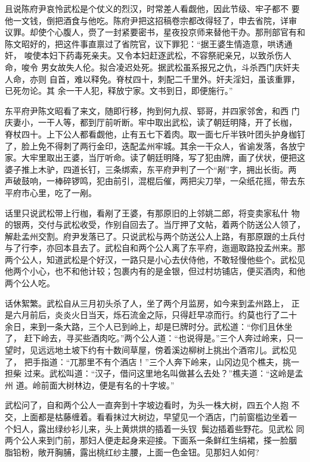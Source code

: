 且说陈府尹哀怜武松是个仗义的烈汉，时常差人看觑他，因此节级、牢子都不
要他一文钱，倒把酒食与他吃。陈府尹把这招稿卷宗都改得轻了，申去省院，详审
议罪。却使个心腹人，赍了一封紧要密书，星夜投京师来替他干办。那刑部官有和
陈文昭好的，把这件事直禀过了省院官，议下罪犯：“据王婆生情造意，哄诱通奸，
唆使本妇下药毒死亲夫。又令本妇赶逐武松，不容祭祀亲兄，以致杀伤人命，唆令
男女故失人伦。拟合凌迟处死。据武松虽系报兄之仇，斗杀西门庆奸夫人命，亦则
自首，难以释免。脊杖四十，刺配二千里外。奸夫淫妇，虽该重罪，已死勿论。其
余一干人犯，释放宁家。文书到日，即便施行。”

东平府尹陈文昭看了来文，随即行移，拘到何九叔、郓哥，并四家邻舍，和西
门庆妻小，一干人等，都到厅前听断。牢中取出武松，读了朝廷明降，开了长枷，
脊杖四十。上下公人都看觑他，止有五七下着肉。取一面七斤半铁叶团头护身枷钉
了，脸上免不得刺了两行金印，迭配孟州牢城。其余一干众人，省谕发落，各放宁
家。大牢里取出王婆，当厅听命。读了朝廷明降，写了犯由牌，画了伏状，便把这
婆子推上木驴，四道长钉，三条绑索，东平府尹判了一个“剐”字，拥出长街。两
声破鼓响，一棒碎锣鸣，犯由前引，混棍后催，两把尖刀举，一朵纸花摇，带去东
平府市心里，吃了一剐。

话里只说武松带上行枷，看剐了王婆，有那原旧的上邻姚二郎，将变卖家私什
物的银两，交付与武松收受，作别自回去了。当厅押了文帖，着两个防送公人领了，
解赴孟州交割。府尹发落已了。只说武松与两个防送公人上路，有那原跟的土兵付
与了行李，亦回本县去了。武松自和两个公人离了东平府，迤逦取路投孟州来。那
两个公人，知道武松是个好汉，一路只是小心去伏侍他，不敢轻慢他些个。武松见
他两个小心，也不和他计较；包裹内有的是金银，但过村坊铺店，便买酒肉，和他
两个公人吃。

话休絮繁。武松自从三月初头杀了人，坐了两个月监房，如今来到孟州路上，
正是六月前后，炎炎火日当天，烁石流金之际，只得赶早凉而行。约莫也行了二十
余日，来到一条大路，三个人已到岭上，却是巳牌时分。武松道：“你们且休坐了，
赶下岭去，寻买些酒肉吃。”两个公人道：“也说得是。”三个人奔过岭来，只一
望时，见远远地土坡下约有十数间草屋，傍着溪边柳树上挑出个酒帘儿。武松见了，
把手指道：“兀那里不有个酒店！”三个人奔下岭来，山冈边见个樵夫，挑一担柴
过来。武松叫道：“汉子，借问这里地名叫做甚么去处？”樵夫道：“这岭是孟州
道。岭前面大树林边，便是有名的十字坡。”

武松问了，自和两个公人一直奔到十字坡边看时，为头一株大树，四五个人抱
不交，上面都是枯藤缠着。看看抹过大树边，早望见一个酒店，门前窗槛边坐着一
个妇人，露出绿纱衫儿来，头上黄烘烘的插着一头钗，鬓边插着些野花。见武松
同两个公人来到门前，那妇人便走起身来迎接。下面系一条鲜红生绢裙，搽一脸胭
脂铅粉，敞开胸脯，露出桃红纱主腰，上面一色金钮。见那妇人如何?

